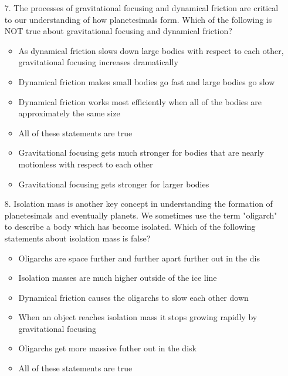 \begin{enumerate}
\item[7.] The processes of gravitational focusing and dynamical friction are critical to our understanding of how planetesimals form. Which of the following is NOT true about gravitational focusing and dynamical friction?

    \begin{itemize}[label={$\bullet$}]
        \item As dynamical friction slows down large bodies with respect to each other, gravitational focusing increases dramatically
        \item  Dynamical friction makes small bodies go fast and large bodies go slow
        \item Dynamical friction works most efficiently when all of the bodies are approximately the same size
        \item All of these statements are true
        \item Gravitational focusing gets much stronger for bodies that are nearly motionless with respect to each other
        \item Gravitational focusing gets stronger for larger bodies
    \end{itemize}
    

\item[8.] Isolation mass is another key concept in understanding the formation of planetesimals and eventually planets. We sometimes use the term "oligarch" to describe a body which has become isolated. Which of the following statements about isolation mass is false?
    \begin{multicols}{2}
    \begin{itemize}[label={$\bullet$}]
        \item Oligarchs are space further and further apart further out in the dis
        \item Isolation masses are much higher outside of the ice line
        \item Dynamical friction causes the oligarchs to slow each other down
        \item When an object reaches isolation mass it stops growing rapidly by gravitational focusing  
        \item Oligarchs get more massive futher out in the disk
        \item All of these statements are true
    \end{itemize}
    \end{multicols}


\end{enumerate}
